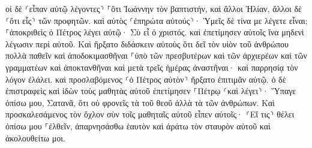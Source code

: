 \documentclass{openreader}
\begin{document}
οἱ δὲ ⸂εἶπαν αὐτῷ λέγοντες⸃ ⸀ὅτι Ἰωάννην τὸν βαπτιστήν, καὶ ἄλλοι Ἠλίαν, ἄλλοι δὲ ⸂ὅτι εἷς⸃ τῶν προφητῶν. 
καὶ αὐτὸς ⸂ἐπηρώτα αὐτούς⸃· Ὑμεῖς δὲ τίνα με λέγετε εἶναι; ⸀ἀποκριθεὶς ὁ Πέτρος λέγει αὐτῷ· Σὺ εἶ ὁ χριστός. 
καὶ ἐπετίμησεν αὐτοῖς ἵνα μηδενὶ λέγωσιν περὶ αὐτοῦ. 
Καὶ ἤρξατο διδάσκειν αὐτοὺς ὅτι δεῖ τὸν υἱὸν τοῦ ἀνθρώπου πολλὰ παθεῖν καὶ ἀποδοκιμασθῆναι ⸀ὑπὸ τῶν πρεσβυτέρων καὶ τῶν ἀρχιερέων καὶ τῶν γραμματέων καὶ ἀποκτανθῆναι καὶ μετὰ τρεῖς ἡμέρας ἀναστῆναι· 
καὶ παρρησίᾳ τὸν λόγον ἐλάλει. καὶ προσλαβόμενος ⸂ὁ Πέτρος αὐτὸν⸃ ἤρξατο ἐπιτιμᾶν αὐτῷ. 
ὁ δὲ ἐπιστραφεὶς καὶ ἰδὼν τοὺς μαθητὰς αὐτοῦ ἐπετίμησεν ⸀Πέτρῳ ⸂καὶ λέγει⸃· Ὕπαγε ὀπίσω μου, Σατανᾶ, ὅτι οὐ φρονεῖς τὰ τοῦ θεοῦ ἀλλὰ τὰ τῶν ἀνθρώπων. 
Καὶ προσκαλεσάμενος τὸν ὄχλον σὺν τοῖς μαθηταῖς αὐτοῦ εἶπεν αὐτοῖς· ⸂Εἴ τις⸃ θέλει ὀπίσω μου ⸀ἐλθεῖν, ἀπαρνησάσθω ἑαυτὸν καὶ ἀράτω τὸν σταυρὸν αὐτοῦ καὶ ἀκολουθείτω μοι. 
\end{document}
